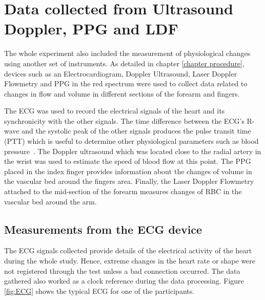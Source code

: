 
\chapter{Data collected from Ultrasound Doppler, PPG and LDF}  %

\ifpdf
\graphicspath{{Chapter8/Figs/Raster/}{Chapter8/Figs/PDF/}{Chapter8/Figs/}}
\else
\graphicspath{{Chapter8/Figs/Vector/}{Chapter8/Figs/}}
\fi

The whole experiment also included the measurement of physiological changes using another set of instruments. As detailed in chapter \ref{chapter procedure}, devices such as an Electrocardiogram, Doppler Ultrasound, Laser Doppler Flowmetry and PPG in the red spectrum were used to collect data related to changes in flow and volume in different sections of the forearm and fingers. 

The ECG was used to record the electrical signals of the heart and its synchronicity with the other signals. The time difference between the ECG's R-wave and the systolic peak of the other signals produces the pulse transit time (PTT) which is useful to determine other physiological parameters such as blood pressure~\cite{liu2017cuffless}. The Doppler ultrasound which was located close to the radial artery in the wrist was used to estimate the speed of blood flow at this point. The PPG placed in the index finger provides information about the changes of volume in the vascular bed around the fingers area. Finally, the Laser Doppler Flowmetry attached to the mid-section of the forearm measures changes of RBC in the vascular bed around the arm. 

\section{Measurements from the ECG device}
\label{section comparison 1}
The ECG signals collected provide details of the electrical activity of the heart during the whole study. Hence, extreme changes in the heart rate or shape were not registered through the test unless a bad connection occurred. The data gathered also worked as a clock reference during the data processing. Figure \ref{fig:ECG} shows the typical ECG for one of the participants.

